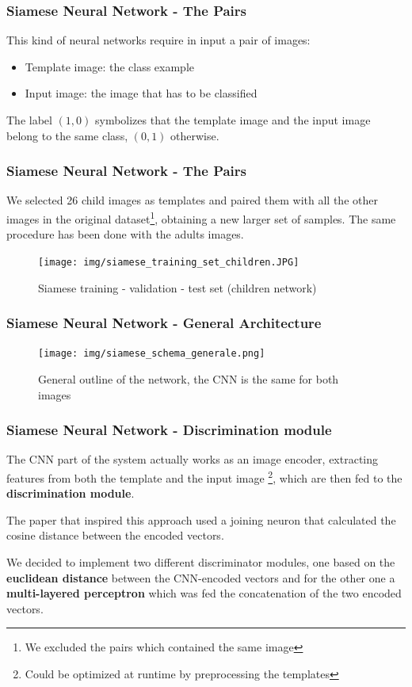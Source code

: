 \documentclass{beamer}
\begin{document}
	\begin{frame}
		\frametitle{Siamese Neural Network - The Pairs}
		This kind of neural networks require in input a pair of images:
		\begin{itemize}
			\item Template image: the class example
			\item Input image: the image that has to be classified
		\end{itemize}		
		The label $(1,0)$ symbolizes that the template image and the input image belong to the same class, $(0,1)$ otherwise.
	\end{frame}
	
	\begin{frame}
		\frametitle{Siamese Neural Network - The Pairs}
		We selected 26 child images as templates and paired them with all the other images in the original dataset\footnote{We excluded the pairs which contained the same image}, obtaining a new larger set of samples. The same procedure has been done with the adults images.
		\begin{figure}
			\centering
			\texttt{[image: img/siamese\_training\_set\_children.JPG]}
    		\caption{Siamese training - validation - test set (children network)}
    		\label{fig:siamese_general}
		\end{figure}
	\end{frame}
	
	\begin{frame}
		\frametitle{Siamese Neural Network - General Architecture}		
		\begin{figure}
			\centering
			\texttt{[image: img/siamese\_schema\_generale.png]}
    		\caption{General outline of the network, the CNN is the same for both images}
    		\label{fig:siamese_dataset}
		\end{figure}
	\end{frame}
	
	\begin{frame}
		\frametitle{Siamese Neural Network - Discrimination module}
		The CNN part of the system actually works as an image encoder, extracting features from both the template and the input image \footnote{Could be optimized at runtime by preprocessing the templates},
		which are then fed to the \textbf{discrimination module}.
		
		The paper that inspired this approach used a joining neuron that calculated the cosine distance between the encoded vectors.
		
		We decided to implement two different discriminator modules, one based on the \textbf{euclidean distance} between the CNN-encoded vectors and for the other one a \textbf{multi-layered perceptron} which was fed the concatenation of the two encoded vectors.
	\end{frame}	
	
\end{document}
